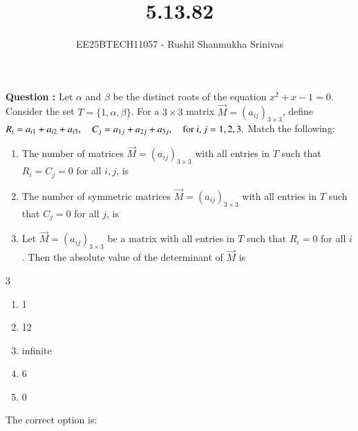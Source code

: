 \documentclass[journal]{IEEEtran}
\begin{document}




\title{5.13.82}
\author{EE25BTECH11057 - Rushil Shanmukha Srinivas
}
{\let\newpage\relax\maketitle}

\renewcommand{\thefigure}{\theenumi}
\renewcommand{\thetable}{\theenumi}
\setlength{\intextsep}{10pt} %

\renewcommand{\thetable}{\theenumi}

\textbf{Question :}
 Let $\alpha$ and $\beta$ be the distinct roots of the equation
$
x^2 + x - 1 = 0.
$
Consider the set $T = \{1, \alpha, \beta\}$. For a $3 \times 3$ matrix $\vec{M} = (a_{ij})_{3 \times 3}$, define
$
R_i = a_{i1} + a_{i2} + a_{i3}, 
\newline
\quad C_j = a_{1j} + a_{2j} + a_{3j}, \quad \text{for } i,j = 1,2,3.
$
Match the following:

\begin{enumerate}
\item[(A)] The number of matrices $\vec{M} = (a_{ij})_{3 \times 3}$ with all entries in $T$ such that $R_i = C_j = 0$ for all $i,j$, is


\item[(B)] The number of symmetric matrices $\vec{M} = (a_{ij})_{3 \times 3}$ with all entries in $T$ such that $C_j = 0$ for all $j$, is


\item[(C)] Let $\vec{M} = (a_{ij})_{3 \times 3}$ be a matrix with all entries in $T$ such that $R_i = 0$  for all $i$. Then the absolute value of the determinant of $\vec{M}$ is

\end{enumerate}
\begin{multicols}{3}
\begin{enumerate}
\item 1 \qquad
\item 12
\item infinite
\item 6
\item 0
\end{enumerate}
\end{multicols}
 The correct option is:
\end{document}

